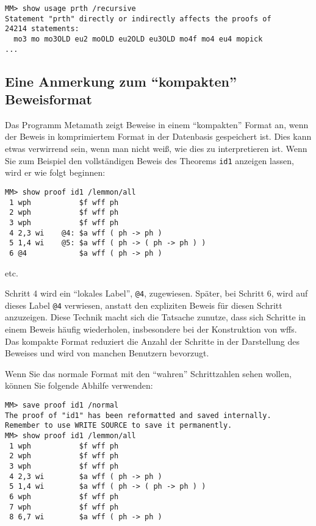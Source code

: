 \begin{verbatim}
MM> show usage prth /recursive
Statement "prth" directly or indirectly affects the proofs of
24214 statements:
  mo3 mo mo3OLD eu2 moOLD eu2OLD eu3OLD mo4f mo4 eu4 mopick
...
\end{verbatim}

\subsection{Eine Anmerkung zum "`kompakten"' \\Beweis\-format}

Das Programm Metamath zeigt Beweise in einem "`kompakten"' Format an, wenn der Beweis in komprimiertem Format in der Datenbasis gespeichert ist.  Dies kann etwas verwirrend sein, wenn man nicht weiß, wie dies zu interpretieren ist. Wenn Sie zum Beispiel den vollständigen Beweis des Theorems \texttt{id1} anzeigen lassen, wird er wie folgt beginnen:

\begin{verbatim}
MM> show proof id1 /lemmon/all
 1 wph           $f wff ph
 2 wph           $f wff ph
 3 wph           $f wff ph
 4 2,3 wi    @4: $a wff ( ph -> ph )
 5 1,4 wi    @5: $a wff ( ph -> ( ph -> ph ) )
 6 @4            $a wff ( ph -> ph )
\end{verbatim}

\begin{center}
{etc.}
\end{center}

Schritt 4 wird ein "`lokales Label"',  \texttt{@4}, zugewiesen. Später, bei Schritt 6, wird auf dieses Label \texttt{@4} verwiesen, anstatt den expliziten Beweis für diesen Schritt anzuzeigen.  Diese Technik macht sich die Tatsache zunutze, dass sich Schritte in einem Beweis häufig wiederholen, insbesondere bei der Konstruktion von wffs.  Das kompakte Format reduziert die Anzahl der Schritte in der Darstellung des Beweises und wird von manchen Benutzern bevorzugt.

Wenn Sie das normale Format mit den "`wahren"' Schrittzahlen sehen wollen, können Sie folgende Abhilfe verwenden:

\begin{verbatim}
MM> save proof id1 /normal
The proof of "id1" has been reformatted and saved internally.
Remember to use WRITE SOURCE to save it permanently.
MM> show proof id1 /lemmon/all
 1 wph           $f wff ph
 2 wph           $f wff ph
 3 wph           $f wff ph
 4 2,3 wi        $a wff ( ph -> ph )
 5 1,4 wi        $a wff ( ph -> ( ph -> ph ) )
 6 wph           $f wff ph
 7 wph           $f wff ph
 8 6,7 wi        $a wff ( ph -> ph )
\end{verbatim}

